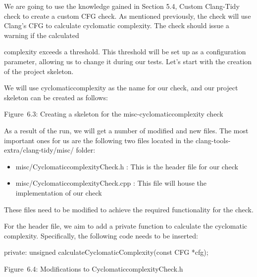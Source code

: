 We are going to use the knowledge gained in Section 5.4, Custom Clang-Tidy check to create a custom CFG check. As mentioned previously, the check will use Clang’s CFG to calculate cyclomatic complexity. The check should issue a warning if the calculated

complexity exceeds a threshold. This threshold will be set up as a configuration parameter, allowing us to change it during our tests. Let’s start with the creation of the project skeleton.



We will use cyclomaticcomplexity as the name for our check, and our project skeleton can be created as follows:


\begin{center}
Figure 6.3: Creating a skeleton for the misc-cyclomaticcomplexity check
\end{center}

As a result of the run, we will get a number of modified and new files. The most important ones for us are the following two files located in the clang-tools-extra/clang-tidy/misc/ folder:

\begin{itemize}
\item
misc/CyclomaticcomplexityCheck.h : This is the header file for our check

\item
misc/CyclomaticcomplexityCheck.cpp : This file will house the implementation of our check
\end{itemize}

These files need to be modified to achieve the required functionality for the check.

For the header file, we aim to add a private function to calculate the cyclomatic complexity. Specifically, the following code needs to be inserted:

\begin{cpp}
private:
  unsigned calculateCyclomaticComplexity(const CFG *cfg);
\end{cpp}

\begin{center}
Figure 6.4: Modifications to CyclomaticcomplexityCheck.h
\end{center}

